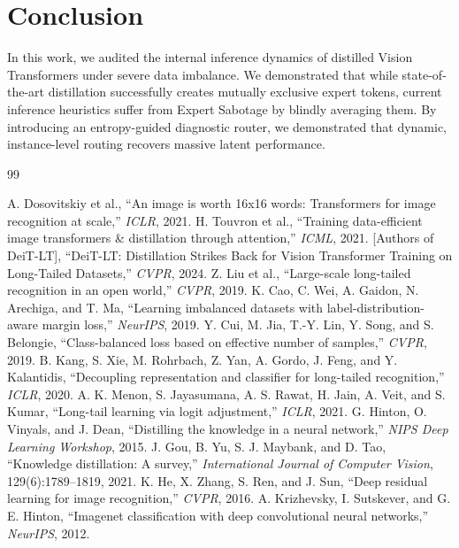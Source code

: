 \documentclass[10pt,twocolumn,letterpaper]{article}
\begin{document}
\section{Conclusion}

In this work, we audited the internal inference dynamics of distilled Vision Transformers under severe data imbalance. We demonstrated that while state-of-the-art distillation successfully creates mutually exclusive expert tokens, current inference heuristics suffer from Expert Sabotage by blindly averaging them. By introducing an entropy-guided diagnostic router, we demonstrated that dynamic, instance-level routing recovers massive latent performance.

\begin{thebibliography}{99}

 A. Dosovitskiy et al., ``An image is worth 16x16 words: Transformers for image recognition at scale,'' \textit{ICLR}, 2021.
 H. Touvron et al., ``Training data-efficient image transformers \& distillation through attention,'' \textit{ICML}, 2021.
 [Authors of DeiT-LT], ``DeiT-LT: Distillation Strikes Back for Vision Transformer Training on Long-Tailed Datasets,'' \textit{CVPR}, 2024.
 Z. Liu et al., ``Large-scale long-tailed recognition in an open world,'' \textit{CVPR}, 2019.
 K. Cao, C. Wei, A. Gaidon, N. Arechiga, and T. Ma, ``Learning imbalanced datasets with label-distribution-aware margin loss,'' \textit{NeurIPS}, 2019.
 Y. Cui, M. Jia, T.-Y. Lin, Y. Song, and S. Belongie, ``Class-balanced loss based on effective number of samples,'' \textit{CVPR}, 2019.
 B. Kang, S. Xie, M. Rohrbach, Z. Yan, A. Gordo, J. Feng, and Y. Kalantidis, ``Decoupling representation and classifier for long-tailed recognition,'' \textit{ICLR}, 2020.
 A. K. Menon, S. Jayasumana, A. S. Rawat, H. Jain, A. Veit, and S. Kumar, ``Long-tail learning via logit adjustment,'' \textit{ICLR}, 2021.
 G. Hinton, O. Vinyals, and J. Dean, ``Distilling the knowledge in a neural network,'' \textit{NIPS Deep Learning Workshop}, 2015.
 J. Gou, B. Yu, S. J. Maybank, and D. Tao, ``Knowledge distillation: A survey,'' \textit{International Journal of Computer Vision}, 129(6):1789–1819, 2021.
 K. He, X. Zhang, S. Ren, and J. Sun, ``Deep residual learning for image recognition,'' \textit{CVPR}, 2016.
 A. Krizhevsky, I. Sutskever, and G. E. Hinton, ``Imagenet classification with deep convolutional neural networks,'' \textit{NeurIPS}, 2012.

\end{thebibliography}
\end{document}
